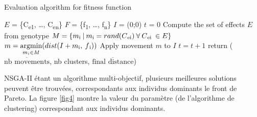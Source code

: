 \documentclass{llncs}
\newcommand{\textoverline}[1]{$\overline{\mbox{#1}}$}
\begin{document}
\begin{algorithm}
\caption{Evaluation algorithm for fitness function}\label{euclid}
  \begin{algorithmic}[1]
    \State $E$ = \{C\textsubscript{e1}, \dots, C\textsubscript{en}\} 
    \State $F$ = \{f\textsubscript{1}, \dots, f\textsubscript{n}\} 
    \State $I$ = (0;0) 
    \State $t$ = 0 
    \State Compute the set of effects $E$ from genotype
            \State $M = \{ m\textsubscript{i}\:|\:m\textsubscript{i} = rand(C\textsubscript{ei})\:\forall\:C\textsubscript{ei}\:\in E\}$
            \State $m = \operatornamewithlimits{argmin}\limits_{m_i \in M}(dist(I+m\textsubscript{i},\:f\textsubscript{i}))$
            \State Apply movement $m$ to $I$
            \State $t = t + 1$
          \EndWhile
        \EndFor
      \EndFor
      \State return (\textoverline{nb movements}, nb clusters, \textoverline{final distance})
  \end{algorithmic}
\end{algorithm}



%

NSGA-II étant un algorithme multi-objectif, plusieurs meilleures solutions peuvent être trouvées, correspondants aux individus dominants le front de Pareto. La figure \ref{fig4} montre la valeur du paramètre (de l'algorithme de clustering) correspondant aux individus dominants.
\end{document}
